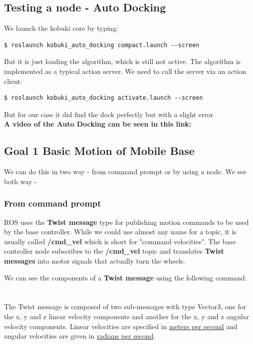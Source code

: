 \documentclass[10pt,a4paper]{article}
\begin{document}
\subsection{Testing a node - Auto Docking}
We launch the kobuki core by typing:

\begin{lstlisting}[frame=single] 
$ roslaunch kobuki_auto_docking compact.launch --screen
\end{lstlisting}
But it is just loading the algorithm, which is still not active. The algorithm is implemented as a typical action server. We need to call the server via an action client:

\begin{lstlisting}[frame=single] 
$ roslaunch kobuki_auto_docking activate.launch --screen
\end{lstlisting}

But for our case it did find the dock perfectly but with a slight error.\\

\textbf{A video of the Auto Docking can be seen in this link:}\\


\subsection{Goal 1 Basic Motion of Mobile Base}

We can do this in two way - from command prompt or by using a node. We see both way - 
\subsubsection{From command prompt}
ROS uses the \textbf{Twist message} type for publishing motion commands to be used by the base controller. While we could use almost any name for a topic, it is usually called \textbf{/cmd\_vel} which is short for "command velocities". The base controller node subscribes to the \textbf{/cmd\_vel} topic and translates \textbf{Twist messages} into motor signals that actually turn the wheels.

We can see the components of a \textbf{Twist message} using the following command:\\\\
\\

The Twist message is composed of two sub-messages with type Vector3, one for the x, y and z linear velocity components and another for the x, y and z angular velocity components. Linear velocities are specified in \underline{meters per second} and angular velocities are given in \underline{radians per second}.\\
\end{document}
